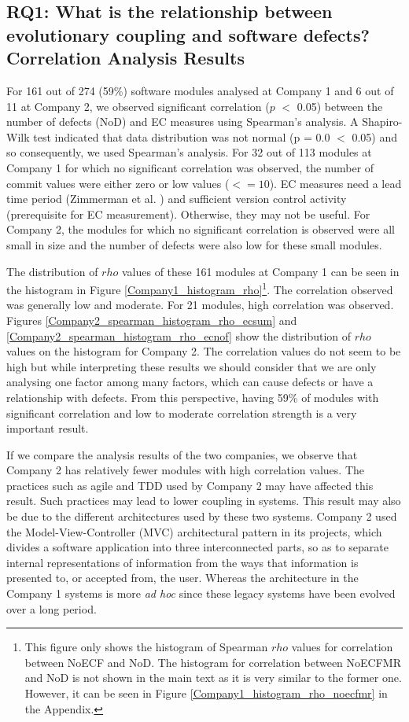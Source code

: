 \documentclass[times]{smrauth}
\begin{document}
\subsection{RQ1: What is the relationship between evolutionary coupling and software defects? Correlation Analysis Results}

For 161 out of 274 (59\%) software modules analysed at Company 1 and 6 out of 11 at Company 2, we observed significant correlation ($p$ $<$ 0.05) between the number of defects (NoD) and EC measures using Spearman's analysis. A Shapiro-Wilk test indicated that data distribution was not normal (p = 0.0 $<$ 0.05) and so consequently, we used Spearman's analysis. For 32 out of 113 modules at Company 1 for which no significant correlation was observed, the number of commit values were either zero or low values ($<=10$). EC measures need a lead time period (Zimmerman et al. \cite{zimmermann2005mining}) and sufficient version control activity (prerequisite for EC measurement). Otherwise, they may not be useful. For Company 2, the modules for which no significant correlation is observed were all small in size and the number of defects were also low for these small modules.


The distribution of $rho$ values of these 161 modules at Company 1 can be seen in the histogram in Figure \ref{Company1_histogram_rho}\footnote{This figure only shows the histogram of Spearman $rho$ values for correlation between NoECF and NoD. The histogram for correlation between NoECFMR and NoD is not shown in the main text as it is very similar to the former one. However, it can be seen in Figure \ref{Company1_histogram_rho_noecfmr} in the Appendix.}. The correlation observed was generally low and moderate. For 21 modules, high correlation was observed. Figures \ref{Company2_spearman_histogram_rho_ecsum} and \ref{Company2_spearman_histogram_rho_ecnof} show the distribution of $rho$ values on the histogram for Company 2. The correlation values do not seem to be high but while interpreting these results we should consider that we are only analysing one factor among many factors, which can cause defects or have a relationship with defects. From this perspective, having 59\% of modules with significant correlation and low to moderate correlation strength is a very important result.



If we compare the analysis results of the two companies, we observe that Company 2 has relatively fewer modules with high correlation values. The practices such as agile and TDD used by Company 2 may have affected this result. Such practices may lead to lower coupling in systems. This result may also be due to the different architectures used by these two systems. Company 2 used the Model-View-Controller (MVC) architectural pattern in its projects, which divides a software application into three interconnected parts, so as to separate internal representations of information from the ways that information is presented to, or accepted from, the user. Whereas the architecture in the Company 1 systems is more \textit{ad hoc} since these legacy systems have been evolved over a long period. 
\end{document}
